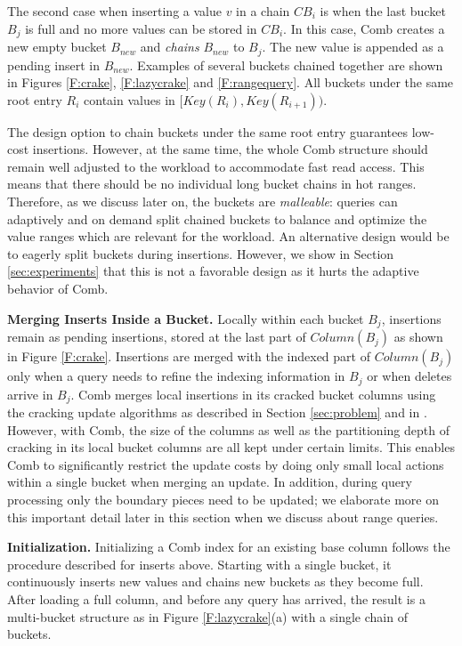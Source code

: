 The second case when inserting a value $v$ in a chain $CB_i$
is when the last bucket $B_j$ is full and no more values can be stored in $CB_i$.
In this case, Comb creates a new empty bucket $B_{new}$
and \emph{chains} $B_{new}$ to $B_j$. The new value is appended as a pending insert in $B_{new}$.
Examples of several buckets chained together are shown in Figures \ref{F:crake}, \ref{F:lazycrake} and \ref{F:rangequery}. 
All buckets under the same root entry $R_i$ contain values in $[Key(R_i),Key(R_{i+1}))$.

The design option to chain buckets under the same root entry guarantees low-cost insertions.
However, at the same time, the whole Comb structure should remain well adjusted to the workload to 
accommodate fast read access.
This means that there should be no individual long bucket chains in hot ranges.
Therefore, as we discuss later on, the buckets are {\em malleable}: 
queries can adaptively and on demand split chained buckets to balance
and optimize the value ranges which are relevant for the workload. 
An alternative design would be to eagerly split buckets during insertions.
However, we show in Section \ref{sec:experiments} that this is not a favorable design as it 
hurts the adaptive behavior of Comb. 



\textbf{Merging Inserts Inside a Bucket.}
Locally within each bucket $B_j$, insertions remain as pending insertions, stored at the last part of $Column(B_j)$
as shown in Figure \ref{F:crake}.
Insertions are merged with the indexed part of $Column(B_j)$ 
only when a query needs to refine the indexing information in $B_j$ or when deletes arrive in $B_j$. 
Comb merges local insertions in its cracked bucket columns using the cracking update algorithms 
as described in Section \ref{sec:problem} and in \cite{IKM:SIGMOD07}.
However, with Comb, the size of the columns as well as the partitioning depth of cracking in its local bucket 
columns are all kept under certain limits. This enables Comb to significantly restrict the update costs
by doing only small local actions within a single bucket when merging an update.
In addition, during query processing only the boundary pieces need to be updated;
we elaborate more on this important detail later in this section when we discuss about range queries.


\textbf{Initialization.}
Initializing a Comb index for an existing base column follows the procedure described for inserts above.
Starting with a single bucket, it continuously inserts new values and chains new buckets as they become full.
After loading a full column, and before any query has arrived,
the result is a multi-bucket structure as in Figure \ref{F:lazycrake}(a) with a single chain of buckets. 

